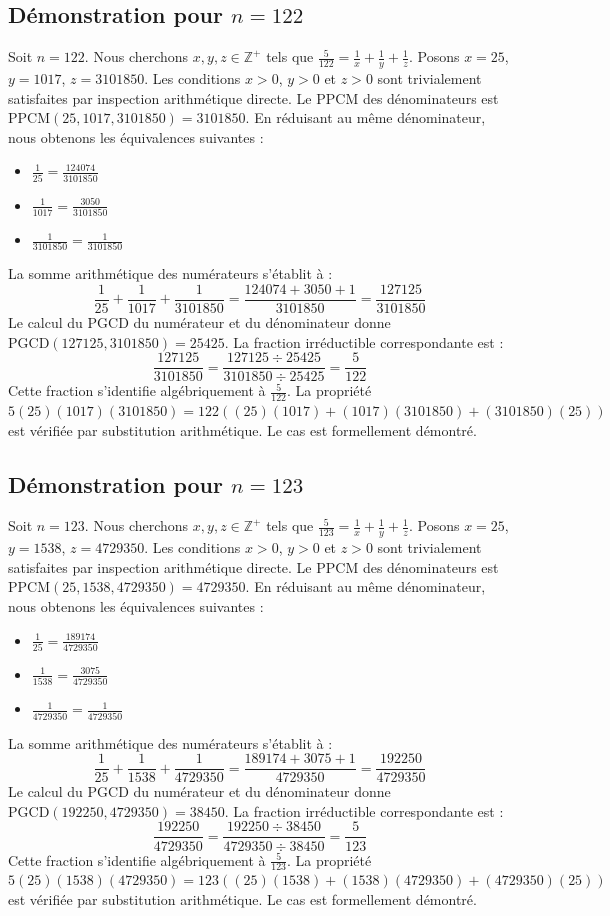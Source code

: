\documentclass[12pt,a4paper]{article}
\begin{document}
\subsection{Démonstration pour $n = 122$}
Soit $n = 122$. Nous cherchons $x, y, z \in \mathbb{Z}^{+}$ tels que $\frac{5}{122} = \frac{1}{x} + \frac{1}{y} + \frac{1}{z}$.
Posons $x = 25$, $y = 1017$, $z = 3101850$.
Les conditions $x > 0$, $y > 0$ et $z > 0$ sont trivialement satisfaites par inspection arithmétique directe.
Le PPCM des dénominateurs est $\text{PPCM}(25, 1017, 3101850) = 3101850$.
En réduisant au même dénominateur, nous obtenons les équivalences suivantes :
\begin{itemize}
    \item $\frac{1}{25} = \frac{124074}{3101850}$
    \item $\frac{1}{1017} = \frac{3050}{3101850}$
    \item $\frac{1}{3101850} = \frac{1}{3101850}$
\end{itemize}
La somme arithmétique des numérateurs s'établit à :
$$ \frac{1}{25} + \frac{1}{1017} + \frac{1}{3101850} = \frac{124074 + 3050 + 1}{3101850} = \frac{127125}{3101850} $$
Le calcul du PGCD du numérateur et du dénominateur donne $\text{PGCD}(127125, 3101850) = 25425$.
La fraction irréductible correspondante est :
$$ \frac{127125}{3101850} = \frac{127125 \div 25425}{3101850 \div 25425} = \frac{5}{122} $$
Cette fraction s'identifie algébriquement à $\frac{5}{122}$.
La propriété $5(25)(1017)(3101850) = 122((25)(1017) + (1017)(3101850) + (3101850)(25))$ est vérifiée par substitution arithmétique.
Le cas est formellement démontré.

\subsection{Démonstration pour $n = 123$}
Soit $n = 123$. Nous cherchons $x, y, z \in \mathbb{Z}^{+}$ tels que $\frac{5}{123} = \frac{1}{x} + \frac{1}{y} + \frac{1}{z}$.
Posons $x = 25$, $y = 1538$, $z = 4729350$.
Les conditions $x > 0$, $y > 0$ et $z > 0$ sont trivialement satisfaites par inspection arithmétique directe.
Le PPCM des dénominateurs est $\text{PPCM}(25, 1538, 4729350) = 4729350$.
En réduisant au même dénominateur, nous obtenons les équivalences suivantes :
\begin{itemize}
    \item $\frac{1}{25} = \frac{189174}{4729350}$
    \item $\frac{1}{1538} = \frac{3075}{4729350}$
    \item $\frac{1}{4729350} = \frac{1}{4729350}$
\end{itemize}
La somme arithmétique des numérateurs s'établit à :
$$ \frac{1}{25} + \frac{1}{1538} + \frac{1}{4729350} = \frac{189174 + 3075 + 1}{4729350} = \frac{192250}{4729350} $$
Le calcul du PGCD du numérateur et du dénominateur donne $\text{PGCD}(192250, 4729350) = 38450$.
La fraction irréductible correspondante est :
$$ \frac{192250}{4729350} = \frac{192250 \div 38450}{4729350 \div 38450} = \frac{5}{123} $$
Cette fraction s'identifie algébriquement à $\frac{5}{123}$.
La propriété $5(25)(1538)(4729350) = 123((25)(1538) + (1538)(4729350) + (4729350)(25))$ est vérifiée par substitution arithmétique.
Le cas est formellement démontré.
\end{document}
